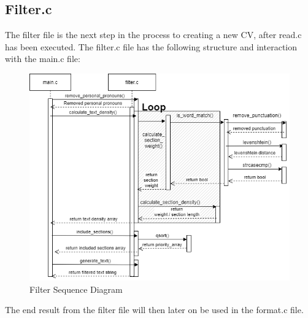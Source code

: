 \subsection{Filter.c}
The filter file is the next step in the process to creating a new CV, after read.c has been executed.
The filter.c file has the following structure and interaction with the main.c file:
\begin{figure}[H]
  \centering
  \includegraphics[scale = 0.6]{figures/filter_flow.png}
  \caption{Filter Sequence Diagram}
\end{figure}
The end result from the filter file will then later on be used in the format.c file.

